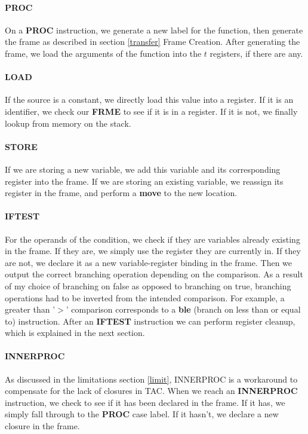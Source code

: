 \documentclass[12pt]{article}
\begin{document}
\paragraph{PROC} On a \textbf{PROC} instruction, we generate a new label for the function, then generate the frame as described in section \ref{transfer} Frame Creation. After generating the frame, we load the arguments of the function into the $t$ registers, if there are any.
\paragraph{LOAD} If the source is a constant, we directly load this value into a register. If it is an identifier, we check our \textbf{FRME} to see if it is in a register. If it is not, we finally lookup from memory on the stack.
\paragraph{STORE} If we are storing a new variable, we add this variable and its corresponding register into the frame. If we are storing an existing variable, we reassign its register in the frame, and perform a \textbf{move} to the new location.
\paragraph{IFTEST} For the operands of the condition, we check if they are variables already existing in the frame. If they are, we simply use the register they are currently in. If they are not, we declare it as a new variable-register binding in the frame. Then we output the correct branching operation depending on the comparison. As a result of my choice of branching on false as opposed to branching on true, branching operations had to be inverted from the intended comparison. For example, a greater than '$>$' comparison corresponds to a \textbf{ble} (branch on less than or equal to) instruction. After an \textbf{IFTEST} instruction we can perform register cleanup, which is explained in the next section.
\paragraph{INNERPROC} As discussed in the limitations section \ref{limit}, INNERPROC is a workaround to compensate for the lack of closures in TAC. When we reach an \textbf{INNERPROC} instruction, we check to see if it has been declared in the frame. If it has, we simply fall through to the \textbf{PROC} case label. If it hasn't, we declare a new closure in the frame.
\end{document}
